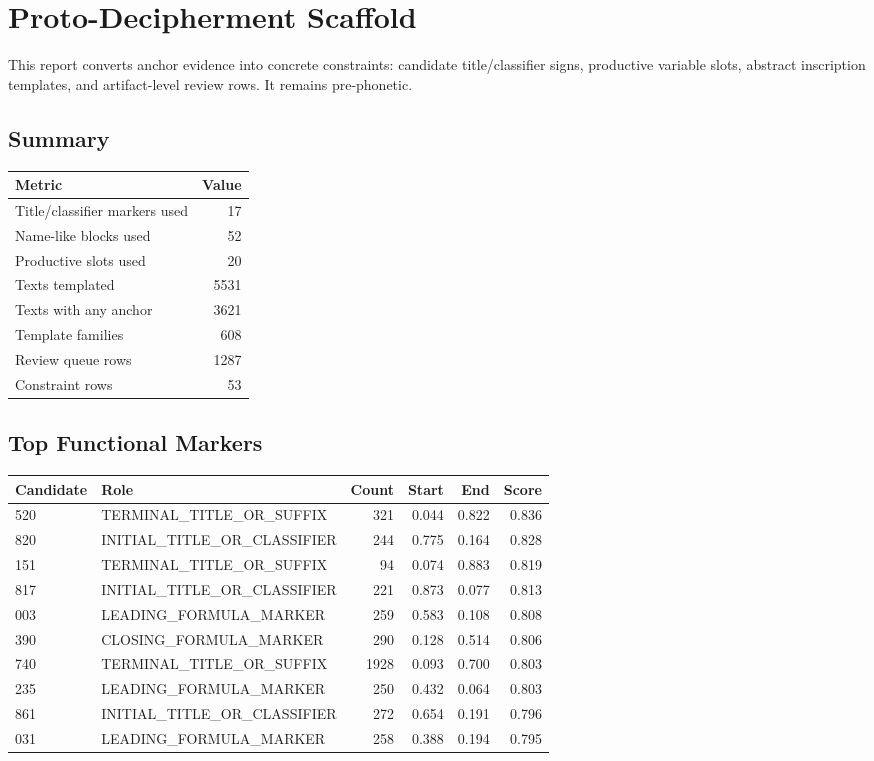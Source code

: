 \documentclass[11pt,a4paper]{article}
\begin{document}
\section*{Proto-Decipherment Scaffold}
This report converts anchor evidence into concrete constraints: candidate title/classifier signs, productive variable slots, abstract inscription templates, and artifact-level review rows. It remains pre-phonetic.
\subsection*{Summary}
\begin{center}
\begin{tabular}{lr}
\toprule
\textbf{Metric} & \textbf{Value} \\
\midrule
Title/classifier markers used & 17 \\
Name-like blocks used & 52 \\
Productive slots used & 20 \\
Texts templated & 5531 \\
Texts with any anchor & 3621 \\
Template families & 608 \\
Review queue rows & 1287 \\
Constraint rows & 53 \\
\bottomrule
\end{tabular}
\end{center}
\subsection*{Top Functional Markers}
\begin{center}
\begin{tabular}{llrrrr}
\toprule
\textbf{Candidate} & \textbf{Role} & \textbf{Count} & \textbf{Start} & \textbf{End} & \textbf{Score} \\
\midrule
520 & TERMINAL\_TITLE\_OR\_SUFFIX & 321 & 0.044 & 0.822 & 0.836 \\
820 & INITIAL\_TITLE\_OR\_CLASSIFIER & 244 & 0.775 & 0.164 & 0.828 \\
151 & TERMINAL\_TITLE\_OR\_SUFFIX & 94 & 0.074 & 0.883 & 0.819 \\
817 & INITIAL\_TITLE\_OR\_CLASSIFIER & 221 & 0.873 & 0.077 & 0.813 \\
003 & LEADING\_FORMULA\_MARKER & 259 & 0.583 & 0.108 & 0.808 \\
390 & CLOSING\_FORMULA\_MARKER & 290 & 0.128 & 0.514 & 0.806 \\
740 & TERMINAL\_TITLE\_OR\_SUFFIX & 1928 & 0.093 & 0.700 & 0.803 \\
235 & LEADING\_FORMULA\_MARKER & 250 & 0.432 & 0.064 & 0.803 \\
861 & INITIAL\_TITLE\_OR\_CLASSIFIER & 272 & 0.654 & 0.191 & 0.796 \\
031 & LEADING\_FORMULA\_MARKER & 258 & 0.388 & 0.194 & 0.795 \\
\bottomrule
\end{tabular}
\end{center}
\end{document}
